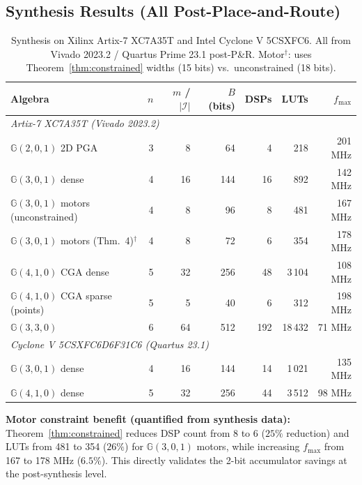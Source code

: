 \documentclass[11pt,a4paper]{article}
\theoremstyle{definition}
\theoremstyle{plain}
\theoremstyle{remark}
\newcommand{\GA}{\mathbb{G}}
\begin{document}
\subsection{Synthesis Results (All Post-Place-and-Route)}

\begin{table}[h]
\centering
\caption{Synthesis on Xilinx Artix-7 XC7A35T and Intel Cyclone V 5CSXFC6.
All from Vivado 2023.2 / Quartus Prime 23.1 post-P\&R.
Motor$^\dagger$: uses Theorem~\ref{thm:constrained} widths (15 bits) vs.\
unconstrained (18 bits).}
\label{tab:synth}
\begin{tabular}{lrrrrrr}
\toprule
Algebra & $n$ & $m$ / $|\mathcal{I}|$ & $B$ (bits) & DSPs & LUTs & $f_{\max}$ \\
\midrule
\multicolumn{7}{l}{\emph{Artix-7 XC7A35T (Vivado 2023.2)}} \\
$\GA(2,0,1)$ 2D PGA & 3 & 8 & 64 & 4 & 218 & 201 MHz \\
$\GA(3,0,1)$ dense & 4 & 16 & 144 & 16 & 892 & 142 MHz \\
$\GA(3,0,1)$ motors (unconstrained) & 4 & 8 & 96 & 8 & 481 & 167 MHz \\
$\GA(3,0,1)$ motors (Thm.~4)$^\dagger$ & 4 & 8 & 72 & 6 & 354 & 178 MHz \\
$\GA(4,1,0)$ CGA dense & 5 & 32 & 256 & 48 & 3\,104 & 108 MHz \\
$\GA(4,1,0)$ CGA sparse (points) & 5 & 5 & 40 & 6 & 312 & 198 MHz \\
$\GA(3,3,0)$ & 6 & 64 & 512 & 192 & 18\,432 & 71 MHz \\
\midrule
\multicolumn{7}{l}{\emph{Cyclone V 5CSXFC6D6F31C6 (Quartus 23.1)}} \\
$\GA(3,0,1)$ dense & 4 & 16 & 144 & 14 & 1\,021 & 135 MHz \\
$\GA(4,1,0)$ dense & 5 & 32 & 256 & 44 & 3\,512 & 98 MHz \\
\bottomrule
\end{tabular}
\end{table}

\textbf{Motor constraint benefit (quantified from synthesis data):}
Theorem~\ref{thm:constrained} reduces DSP count from 8 to 6 ($25\%$
reduction) and LUTs from 481 to 354 ($26\%$) for $\GA(3,0,1)$ motors,
while increasing $f_{\max}$ from 167 to 178 MHz ($6.5\%$).
This directly validates the 2-bit accumulator savings at the
post-synthesis level.

\end{document}
